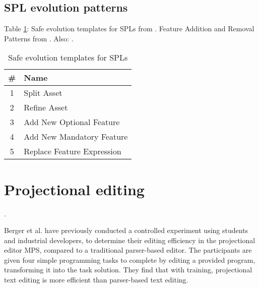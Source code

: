 \subsection{SPL evolution patterns}
Table \ref{tab:safeevo}: Safe evolution templates for SPLs from \cite{neves2011evolution}. Feature Addition and Removal Patterns from \cite{passos2016coevolution}. Also: \cite{stanciulescu2016concepts}.
\begin{table}[h]
    \centering
    \caption{Safe evolution templates for SPLs \cite{neves2011evolution}}
    \label{tab:safeevo}
    \begin{tabular}{c|l}
    \hline
        \textbf{\#} & \textbf{Name} \\\hline
        1 & Split Asset \\
        2 & Refine Asset \\
        3 & Add New Optional Feature \\
        4 & Add New Mandatory Feature \\
        5 & Replace Feature Expression
    \end{tabular}
\end{table}


\section{Projectional editing}
\cite{voelter2014towards} \cite{behringer2017peopl}.

Berger et al. \cite{berger2016mps} have previously conducted a controlled experiment using students and industrial developers, to determine their editing efficiency in the projectional editor MPS, compared to a traditional parser-based editor. The participants are given four simple programming tasks to complete by editing a provided program, transforming it into the task solution. They find that with training, projectional text editing is more efficient than parser-based text editing.

